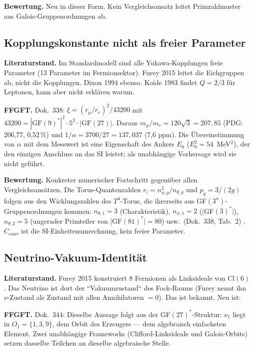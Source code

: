 \textbf{Bewertung.} Neu in dieser Form. Kein Vergleichsansatz leitet
Primzahlmuster aus Galois-Gruppenordnungen ab.

\subsection{Kopplungskonstante nicht als freier Parameter \KM}

\textbf{Literaturstand.} Im Standardmodell sind alle Yukawa-Kopplungen
freie Parameter (13 Parameter im Fermionsektor). Furey 2015 leitet die
Eichgruppen ab, nicht die Kopplungen. Dixon 1994 ebenso. Koide 1983
findet $Q=2/3$ für Leptonen, kann aber nicht erklären warum.

\textbf{FFGFT.} Dok.~338: $\xi=(r_\mu/r_e)^2/43200$ mit
$43200=|\mathrm{GF}(9)^*|^2\cdot5^2\cdot|\mathrm{GF}(27)|$. Daraus
$m_\mu/m_e=120\sqrt3=207{,}85$ (PDG: 206{,}77, 0,52\,\%) und
$1/\alpha=3700/27=137{,}037$ (7,6 ppm). Die Übereinstimmung von $\alpha$ mit dem
Messwert ist eine Eigenschaft des Ankers $E_0$ ($E_0^2=54$~MeV$^2$), der den
einzigen Anschluss an das SI leistet; als unabhängige Vorhersage wird sie nicht geführt.

\textbf{Bewertung.} Konkreter numerischer Fortschritt gegenüber allen
Vergleichsansätzen. Die Torus-Quantenzahlen $r_i = n_{\phi,g}^2/n_{\theta,g}$ und $p_g=3/(2g)$
folgen aus den Wicklungszahlen des $T^4$-Torus, die ihrerseits aus
GF$(3^n)$-Gruppenordnungen kommen: $n_{\theta,1}=3$ (Charakteristik),
$n_{\phi,1}=2$ (|GF$(3)^*|$), $n_{\theta,2}=5$ (ungerader Primteiler
von |GF$(81)^*|=80$) usw.\ (Dok.~338, Tab.~2) \KM.
$C_\text{conv}$ ist die SI-Einheitenumrechnung, kein freier Parameter.

\subsection{Neutrino-Vakuum-Identität \BM}

\textbf{Literaturstand.} Furey 2015 konstruiert 8 Fermionen als Linksideale
von Cl$(6)$. Das Neutrino ist dort der ``Vakuumzustand`` des Fock-Raums
(Furey nennt ihn $\nu$-Zustand als Zustand mit allen Annihilatoren $=0$).
Das ist bekannt. Neu ist:

\textbf{FFGFT.} Dok.~344: Dieselbe Aussage folgt aus der GF$(27)^*$-Struktur:
$\nu_1$ liegt in $O_1=\{1,3,9\}$, dem Orbit des Erzeugers --- dem algebraisch
einfachsten Element. Zwei unabhängige Frameworks (Clifford-Linksideale und
Galois-Orbits) setzen dasselbe Teilchen an dieselbe algebraische Stelle.

